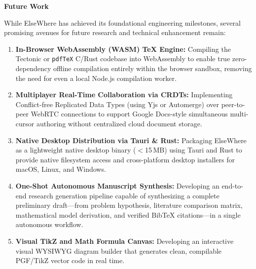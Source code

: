 \documentclass[12pt,a4paper,twoside]{article}
\newcommand{\numhead}[3]{%
  \begingroup\setlength{\parskip}{0pt}%
  \noindent\hspace*{0.25in}\makebox[0.25in][l]{\fontsize{18pt}{21.6pt}\selectfont\bfseries #1.}%
  {\fontsize{18pt}{21.6pt}\selectfont\bfseries #2}{\fontsize{18pt}{21.6pt}\selectfont #3}\par\nopagebreak
  \vspace{6pt}
  \endgroup}
\newcommand{\code}[1]{\texttt{#1}}
\begin{document}
\newpage
\numhead{7}{Future Work}{}

\noindent While ElseWhere has achieved its foundational engineering milestones, several promising avenues for future research and technical enhancement remain:
\begin{enumerate}[leftmargin=0.5in,labelindent=0pt,labelwidth=0.25in,labelsep=0pt,
                  itemsep=2pt,parsep=0pt,topsep=2pt,partopsep=0pt,align=left]
    \item \textbf{In-Browser WebAssembly (WASM) \TeX{} Engine:} Compiling the Tectonic or \code{pdfTeX} C/Rust codebase into WebAssembly to enable true zero-dependency offline compilation entirely within the browser sandbox, removing the need for even a local Node.js compilation worker.
    \item \textbf{Multiplayer Real-Time Collaboration via CRDTs:} Implementing Conflict-free Replicated Data Types (using Yjs or Automerge) over peer-to-peer WebRTC connections to support Google Docs-style simultaneous multi-cursor authoring without centralized cloud document storage.
    \item \textbf{Native Desktop Distribution via Tauri \& Rust:} Packaging ElseWhere as a lightweight native desktop binary ($<$15\,MB) using Tauri and Rust to provide native filesystem access and cross-platform desktop installers for macOS, Linux, and Windows.
    \item \textbf{One-Shot Autonomous Manuscript Synthesis:} Developing an end-to-end research generation pipeline capable of synthesizing a complete preliminary draft---from problem hypothesis, literature comparison matrix, mathematical model derivation, and verified Bib\TeX{} citations---in a single autonomous workflow.
    \item \textbf{Visual TikZ and Math Formula Canvas:} Developing an interactive visual WYSIWYG diagram builder that generates clean, compilable PGF/TikZ vector code in real time.
\end{enumerate}
\end{document}
